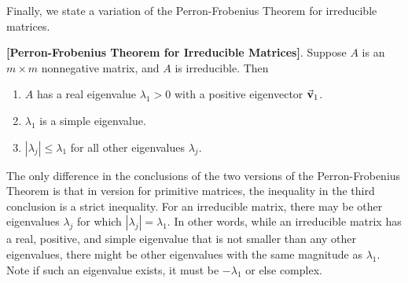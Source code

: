 Finally, we state a variation of the Perron-Frobenius Theorem
for irreducible matrices.
\begin{theorem}
\textrm{\textbf{[Perron-Frobenius Theorem for Irreducible Matrices]}}.
Suppose $A$ is an $m\times m$ nonnegative matrix, and $A$ is irreducible.
Then
\begin{enumerate}
\item $A$ has a real eigenvalue $\lambda_1>0$ with 
a positive eigenvector $\vec{\textbf{v}}_1$.
\item $\lambda_1$ is a simple eigenvalue.
\item $|\lambda_j| \le \lambda_1$ for all other eigenvalues
$\lambda_j$.
\end{enumerate}
\end{theorem}


The only difference in the conclusions of the two versions
of the Perron-Frobenius Theorem
is that in version for primitive matrices, the inequality in the third
conclusion is a strict inequality.
For an irreducible matrix, there may be other eigenvalues $\lambda_j$
for which $|\lambda_j| = \lambda_1$.
In other words, while an irreducible matrix has a real, positive, and simple
eigenvalue that is not smaller than any other eigenvalues, there might be
other eigenvalues with the same magnitude as $\lambda_1$.  Note if such
an eigenvalue exists, it must be $-\lambda_1$ or else complex.

